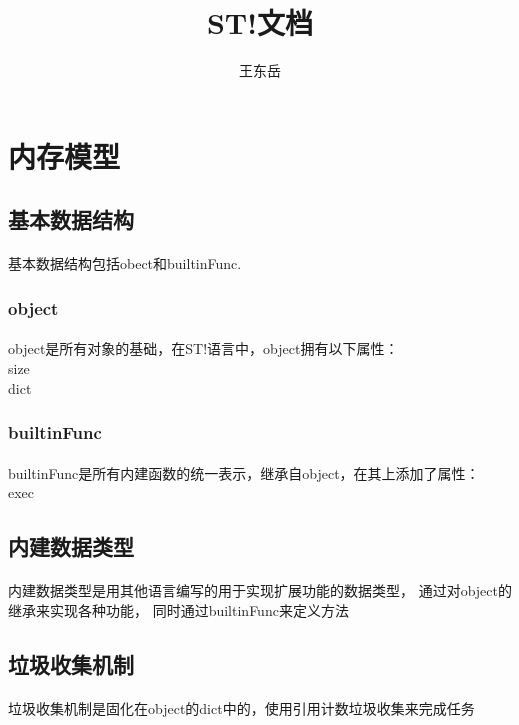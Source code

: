\documentclass[UTF8, 12pt, a4paper]{article}
\author{王东岳}
\title{ST!文档}
\begin{document}
	\maketitle
	\newpage
	\section{内存模型}
		\subsection{基本数据结构}
			\paragraph{}
				基本数据结构包括obect和builtinFunc.
		\subsubsection{object}
			\paragraph{}
				object是所有对象的基础，在ST!语言中，object拥有以下属性：
				\\ size
				\\ dict
		\subsubsection{builtinFunc}
			\paragraph{}
				builtinFunc是所有内建函数的统一表示，继承自object，在其上添加了属性：
				\\ exec
		\subsection{内建数据类型}
			\paragraph{}
				内建数据类型是用其他语言编写的用于实现扩展功能的数据类型，
				通过对object的继承来实现各种功能，
				同时通过builtinFunc来定义方法
		\subsection{垃圾收集机制}
			\paragraph{}
				垃圾收集机制是固化在object的dict中的，使用引用计数垃圾收集来完成任务
\end{document}
